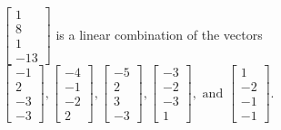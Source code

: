 \begin{exercise}
\begin{exerciseStatement}
  \end{exerciseStatement}
  \begin{exerciseAnswer}
   \(\left[\begin{array}{c}
1 \\
8 \\
1 \\
-13
\end{array}\right]\) 
  	 is  
	a linear combination of the vectors \(\left[\begin{array}{c}
-1 \\
2 \\
-3 \\
-3
\end{array}\right] , \left[\begin{array}{c}
-4 \\
-1 \\
-2 \\
2
\end{array}\right] , \left[\begin{array}{c}
-5 \\
2 \\
3 \\
-3
\end{array}\right] , \left[\begin{array}{c}
-3 \\
-2 \\
-3 \\
1
\end{array}\right] , \text{ and } \left[\begin{array}{c}
1 \\
-2 \\
-1 \\
-1
\end{array}\right]\).

	
  


  \end{exerciseAnswer}
\end{exercise}